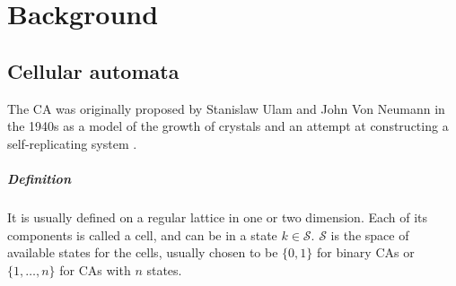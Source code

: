 \chapter{Background}
\label{cha:background}

\section{Cellular automata}

The \acf{CA} was originally proposed by Stanislaw Ulam and John Von
Neumann in the 1940s as a model of the growth of crystals and an attempt at
constructing a self-replicating system \parencite{von_neumann_theory_1966}.

\paragraph{Definition}
It is usually defined on a regular lattice in one or two dimension. Each of its
components is called a cell, and can be in a state $k \in \mathcal{S}$. $\mathcal{S}$ is the space of
available states for the cells, usually chosen to be $\{0, 1\}$ for binary
\acp{CA} or $\{1, \ldots, n\}$ for \acp{CA} with $n$ states.

